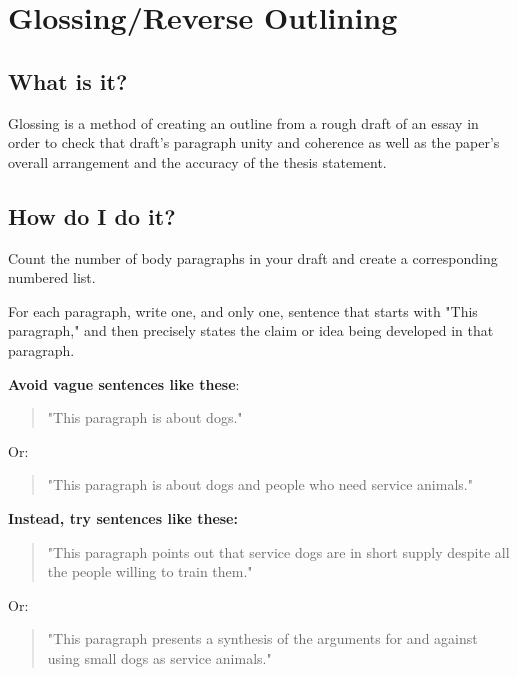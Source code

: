 
\chapter{Glossing/Reverse Outlining}

\section{What is it?}

Glossing is a method of creating an outline from a rough draft of an essay in order to 
check that draft's paragraph unity and coherence as well as the paper's overall 
arrangement and the accuracy of the thesis statement.

\section{How do I do it?}

Count the number of body paragraphs in your draft and create a corresponding 
numbered list.

For each paragraph, write one, and only one, sentence that starts with "This paragraph,"
and then  precisely states the claim or idea being developed in that paragraph.
        	
\textbf{Avoid vague sentences like these}:

\begin{quote} "This paragraph is about dogs." \end{quote}

Or:

\begin{quote} "This paragraph is about dogs and people who need service animals." 
\end{quote}
        	
\textbf{Instead, try sentences like these:}
                    	     	
\begin{quote} "This paragraph points out that service dogs are in short supply despite 
all the people willing to train them."\end{quote}
 
 Or:
                                	
\begin{quote} "This paragraph presents a synthesis of the arguments for and against 
using  small dogs as service animals." \end{quote}
                 

